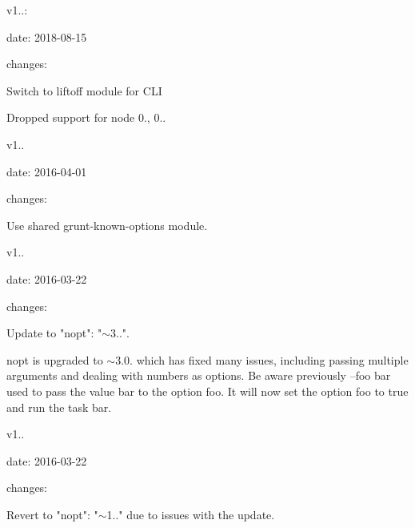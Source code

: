 v1..\+:
\begin{DoxyItemize}
\item date\+: 2018-\/08-\/15
\item changes\+:
\begin{DoxyItemize}
\item Switch to \textquotesingle{}liftoff\textquotesingle{} module for CLI
\item Dropped support for node 0., 0..
\end{DoxyItemize}
\end{DoxyItemize}

v1..
\begin{DoxyItemize}
\item date\+: 2016-\/04-\/01
\item changes\+:
\begin{DoxyItemize}
\item Use shared grunt-\/known-\/options module.
\end{DoxyItemize}
\end{DoxyItemize}

v1..
\begin{DoxyItemize}
\item date\+: 2016-\/03-\/22
\item changes\+:
\begin{DoxyItemize}
\item Update to "{}nopt"{}\+: "{}\texorpdfstring{$\sim$}{\string~}3.."{}.
\item nopt is upgraded to \texorpdfstring{$\sim$}{\string~}3.0. which has fixed many issues, including passing multiple arguments and dealing with numbers as options. Be aware previously --foo bar used to pass the value \textquotesingle{}bar\textquotesingle{} to the option foo. It will now set the option foo to true and run the task bar.
\end{DoxyItemize}
\end{DoxyItemize}

v1..
\begin{DoxyItemize}
\item date\+: 2016-\/03-\/22
\item changes\+:
\begin{DoxyItemize}
\item Revert to "{}nopt"{}\+: "{}\texorpdfstring{$\sim$}{\string~}1.."{} due to issues with the update.
\end{DoxyItemize}
\end{DoxyItemize}

